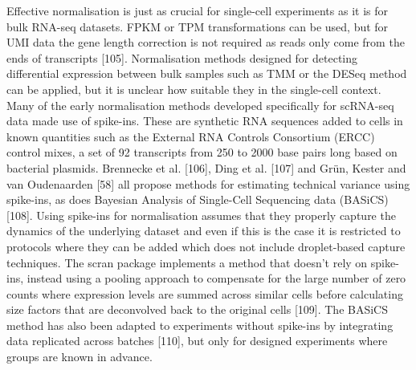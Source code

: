 \documentclass[11pt,a4paper,titlepage,twoside,openright]{style/unimelbthesis}
\theoremstyle{definition}
\theoremstyle{definition}
\theoremstyle{definition}
\theoremstyle{remark}
\begin{document}
\begin{mainmatter}
Effective normalisation is just as crucial for single-cell experiments as it is for bulk RNA-seq datasets. FPKM or TPM transformations can be used, but for UMI data the gene length correction is not required as reads only come from the ends of transcripts {[}105{]}. Normalisation methods designed for detecting differential expression between bulk samples such as TMM or the DESeq method can be applied, but it is unclear how suitable they in the single-cell context. Many of the early normalisation methods developed specifically for scRNA-seq data made use of spike-ins. These are synthetic RNA sequences added to cells in known quantities such as the External RNA Controls Consortium (ERCC) control mixes, a set of 92 transcripts from 250 to 2000 base pairs long based on bacterial plasmids. Brennecke et al. {[}106{]}, Ding et al. {[}107{]} and Grün, Kester and van Oudenaarden {[}58{]} all propose methods for estimating technical variance using spike-ins, as does Bayesian Analysis of Single-Cell Sequencing data (BASiCS) {[}108{]}. Using spike-ins for normalisation assumes that they properly capture the dynamics of the underlying dataset and even if this is the case it is restricted to protocols where they can be added which does not include droplet-based capture techniques. The scran package implements a method that doesn't rely on spike-ins, instead using a pooling approach to compensate for the large number of zero counts where expression levels are summed across similar cells before calculating size factors that are deconvolved back to the original cells {[}109{]}. The BASiCS method has also been adapted to experiments without spike-ins by integrating data replicated across batches {[}110{]}, but only for designed experiments where groups are known in advance.


\end{mainmatter}
\end{document}
